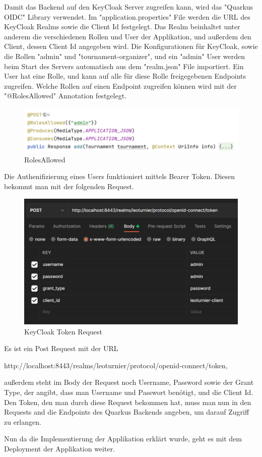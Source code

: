 Damit das Backend auf den KeyCloak Server zugreifen kann, wird das "Quarkus OIDC" Library verwendet. Im "application.properties" File werden die URL des KeyCloak Realms 
sowie die Client Id festgelegt. Das Realm beinhaltet unter anderem die verschiedenen Rollen und User der Applikation, und außerdem den Client, dessen Client Id angegeben wird. 
Die Konfigurationen für KeyCloak, sowie die Rollen "admin" und "tournament-organizer", und ein "admin" User werden beim Start des Servers automatisch aus dem "realm.json" File importiert.
Ein User hat eine Rolle, und kann auf alle für diese Rolle freigegebenen Endpoints zugreifen.
Welche Rollen auf einen Endpoint zugreifen können wird mit der "@RolesAllowed" Annotation festgelegt. 

\begin{figure}[H]
    \includegraphics[scale=0.6]{pics/backend/rolesAllowed.png}
    \caption{RolesAllowed}
\end{figure}

Die Authenifizierung eines Users funktioniert mittels Bearer Token. Diesen bekommt man mit der folgenden Request.

\begin{figure}[H]
    \includegraphics[scale=0.6]{pics/backend/keycloak_token_request.png}
    \caption{KeyCloak Token Request}
\end{figure}

Es ist ein Post Request mit der URL 

http://localhost:8443/realms/leoturnier/protocol/openid-connect/token, 

außerdem steht im Body der Request noch Username, Password sowie der Grant Type, der angibt, dass man Username und Passwort benötigt, und die Client Id. 
Den Token, den man durch diese Request bekommen hat, muss man nun in den Requests and die Endpoints des Quarkus Backends angeben, um darauf Zugriff zu erlangen.

Nun da die Implementierung der Applikation erklärt wurde, geht es mit dem Deployment der Applikation weiter.